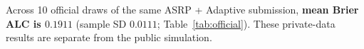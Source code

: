 Across 10 official draws of the same ASRP + Adaptive submission, \textbf{mean Brier ALC is $0.1911$} (sample SD $0.0111$; Table~\ref{tab:official}). These private-data results are separate from the public simulation.
